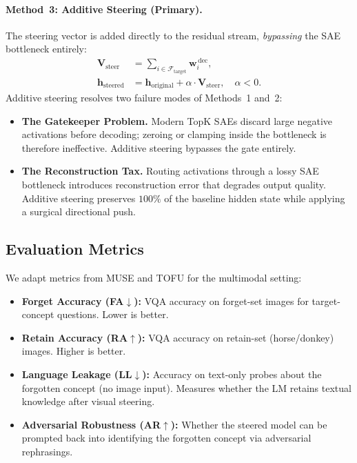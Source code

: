 \documentclass{article}
\begin{document}
\paragraph{Method~3: Additive Steering (Primary).}
The steering vector is added directly to the residual stream,
\emph{bypassing} the SAE bottleneck entirely:
\begin{align}
  \mathbf{V}_{\text{steer}} &= \sum_{i\in\mathcal{F}_{\text{target}}}
    \mathbf{w}_i^{\,\text{dec}}, \label{eq:vsteer}\\
  \mathbf{h}_{\text{steered}} &= \mathbf{h}_{\text{original}}
    + \alpha\cdot\mathbf{V}_{\text{steer}}, \quad \alpha < 0.
  \label{eq:additive}
\end{align}
Additive steering resolves two failure modes of Methods~1 and~2:
\begin{itemize}\setlength\itemsep{2pt}
  \item \textbf{The Gatekeeper Problem.} Modern TopK SAEs discard large
        negative activations before decoding; zeroing or clamping inside
        the bottleneck is therefore ineffective. Additive steering
        bypasses the gate entirely.
  \item \textbf{The Reconstruction Tax.} Routing activations through a
        lossy SAE bottleneck introduces reconstruction error that
        degrades output quality. Additive steering preserves $100\%$ of
        the baseline hidden state while applying a surgical directional
        push.
\end{itemize}

\subsection{Evaluation Metrics}
\label{sec:metrics}

We adapt metrics from MUSE \citep{shi2024muse} and TOFU
\citep{maini2024tofu} for the multimodal setting:

\begin{itemize}\setlength\itemsep{2pt}
  \item \textbf{Forget Accuracy (FA$\downarrow$):} VQA accuracy on
        forget-set images for target-concept questions. Lower is better.
  \item \textbf{Retain Accuracy (RA$\uparrow$):} VQA accuracy on
        retain-set (horse/donkey) images. Higher is better.
  \item \textbf{Language Leakage (LL$\downarrow$):} Accuracy on
        text-only probes about the forgotten concept (no image input).
        Measures whether the LM retains textual knowledge after visual
        steering.
  \item \textbf{Adversarial Robustness (AR$\uparrow$):} Whether the
        steered model can be prompted back into identifying the forgotten
        concept via adversarial rephrasings.
\end{itemize}
\end{document}
